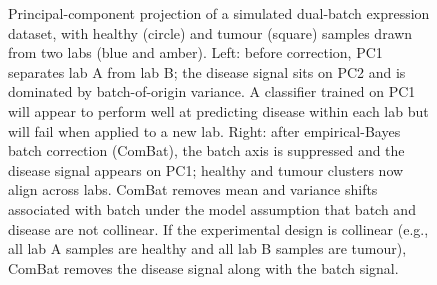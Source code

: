 \begin{figure}[htbp]
\caption[Batch effect before and after correction]{Principal-component
projection of a simulated dual-batch expression dataset, with
healthy (circle) and tumour (square) samples drawn from two labs
(blue and amber). Left: before correction, PC1 separates lab A from
lab B; the disease signal sits on PC2 and is dominated by
batch-of-origin variance. A classifier trained on PC1 will appear
to perform well at predicting disease within each lab but will fail
when applied to a new lab. Right: after empirical-Bayes batch
correction (ComBat), the batch axis is suppressed and the disease
signal appears on PC1; healthy and tumour clusters now align across
labs. ComBat removes mean and variance shifts associated with batch
under the model assumption that batch and disease are not
collinear. If the experimental design is collinear (e.g., all lab A
samples are healthy and all lab B samples are tumour), ComBat
removes the disease signal along with the batch signal.}
\label{fig:vol06:ch11:batch-effect}
\end{figure}

